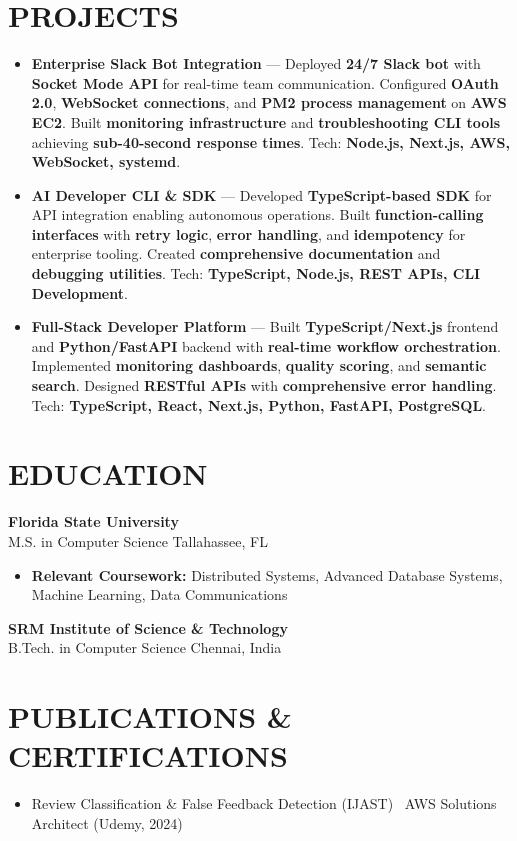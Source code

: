 \documentclass[letterpaper,10pt]{article}
\newcommand{\resumeItem}[1]{\item\small #1}
\newcommand{\resumeSubheading}[4]{
  \vspace{6pt}
  \noindent
  \textbf{#1} \hfill {\footnotesize #2} \\
  [-1pt]
  \noindent
  \small #3 \hfill {\small #4}
  \vspace{3pt}
}
\newcommand{\resumeItemsStart}{\vspace{-2pt}\begin{itemize}}
\newcommand{\resumeItemsEnd}{\end{itemize}\vspace{6pt}}
\begin{document}
\section{\textcolor{metablue}{PROJECTS}}
\vspace{-8pt}
\begin{tcolorbox}[colback=white,colframe=metablue,boxrule=0.8pt,arc=2pt,left=4pt,right=4pt,top=2pt,bottom=2pt,before skip=0pt]
\begin{itemize}
\resumeItem{\textbf{Enterprise Slack Bot Integration} --- Deployed \textbf{24/7 Slack bot} with \textbf{Socket Mode API} for real-time team communication. Configured \textbf{OAuth 2.0}, \textbf{WebSocket connections}, and \textbf{PM2 process management} on \textbf{AWS EC2}. Built \textbf{monitoring infrastructure} and \textbf{troubleshooting CLI tools} achieving \textbf{sub-40-second response times}. Tech: \textbf{Node.js, Next.js, AWS, WebSocket, systemd}.}

\resumeItem{\textbf{AI Developer CLI \& SDK} --- Developed \textbf{TypeScript-based SDK} for API integration enabling autonomous operations. Built \textbf{function-calling interfaces} with \textbf{retry logic}, \textbf{error handling}, and \textbf{idempotency} for enterprise tooling. Created \textbf{comprehensive documentation} and \textbf{debugging utilities}. Tech: \textbf{TypeScript, Node.js, REST APIs, CLI Development}.}

\resumeItem{\textbf{Full-Stack Developer Platform} --- Built \textbf{TypeScript/Next.js} frontend and \textbf{Python/FastAPI} backend with \textbf{real-time workflow orchestration}. Implemented \textbf{monitoring dashboards}, \textbf{quality scoring}, and \textbf{semantic search}. Designed \textbf{RESTful APIs} with \textbf{comprehensive error handling}. Tech: \textbf{TypeScript, React, Next.js, Python, FastAPI, PostgreSQL}.}

\end{itemize}
\end{tcolorbox}
\vspace{-5pt}


\section{\textcolor{metablue}{EDUCATION}}
\vspace{-10pt}
\resumeSubheading
{Florida State University}{}
{M.S. in Computer Science}{Tallahassee, FL}
\resumeItemsStart
\resumeItem{\textbf{Relevant Coursework:} Distributed Systems, Advanced Database Systems, Machine Learning, Data Communications}
\resumeItemsEnd
\vspace{-5pt}
\resumeSubheading
{SRM Institute of Science \& Technology}{}
{B.Tech. in Computer Science}{Chennai, India}
\vspace{-10pt}

\section{\textcolor{metablue}{PUBLICATIONS \& CERTIFICATIONS}}
\vspace{-5pt}
\begin{itemize}
\resumeItem{Review Classification \& False Feedback Detection (IJAST) \textbar\ AWS Solutions Architect (Udemy, 2024)}
\end{itemize}
\end{document}
